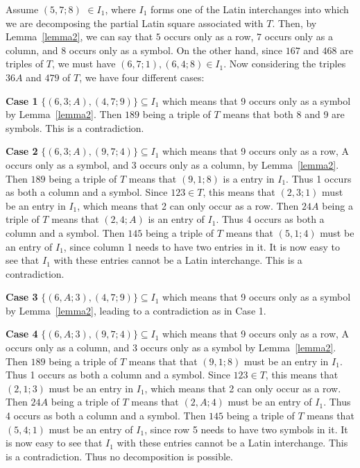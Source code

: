 \documentclass[12pt]{report}
\begin{document}
Assume $(5, 7; 8)$ $\in I_1$, where $I_1$ forms one of the Latin interchanges 
into which we are decomposing the partial Latin square associated 
with $T$.  Then, by Lemma~\ref{lemma2}, we can say that 
$5$ occurs only as a row, $7$ occurs only as a column, and $8$ occurs
only as a symbol. On the other hand, since $167$ and $468$ are triples of $T$,
we must have $(6,7;1),(6,4;8)\in I_1$. Now considering
the triples $36A$ and $479$ of $T$, we have four different cases:

{\bf Case 1} $\{ (6, 3; A), (4, 7; 9) \} \subseteq I_1$ which means 
that 9 occurs only as a symbol by Lemma~\ref{lemma2}. Then $189$ being a 
triple of $T$ means that both 8 and 9 are symbols. This is a contradiction.

{\bf Case 2} $\{ (6, 3; A), (9, 7; 4) \} \subseteq I_1$ which means that 
9 occurs only as a row, A occurs only as a symbol, and 3 occurs only as a
column, by Lemma~\ref{lemma2}.  Then $189$ being a triple of $T$ means that 
$(9, 1; 8)$ is a entry in $I_1$.  Thus 1 occurs as both a column and 
a symbol. Since $123 \in T$, this means that $(2, 3; 1)$ must be
an entry in $I_1$, which means that 2 can only occur as a row.
Then $24A$ being a triple of $T$ means that $(2, 4; A)$ is an entry of $I_1$.
Thus 4 occurs as both a column and a symbol.
Then $145$ being a triple of $T$ means that $(5, 1; 4)$ must be an entry of $I_1$,
since column 1 needs to have two entries in it. It is now easy to see 
that $I_1$ with these entries cannot be a Latin interchange.
This is a contradiction.

{\bf Case 3} $\{ (6, A; 3), (4, 7; 9) \} \subseteq I_1$ which means that 
9 occurs only as a symbol by Lemma~\ref{lemma2}, leading to a 
contradiction as in Case 1.

{\bf Case 4} $\{ (6, A; 3), (9, 7; 4) \} \subseteq I_1$ which means 
that 9 occurs only as a row, A occurs only as a column, and 3 occurs 
only as a symbol by Lemma~\ref{lemma2}.  
Then $189$ being a triple of $T$ means that that $(9, 1; 8)$
must be an entry in $I_1$.  Thus 1 occurs as both a column and a symbol.
Since $123 \in T$, this means that $(2, 1; 3)$ must be
an entry in $I_1$, which means that 2 can only occur as a row.
Then $24A$ being a triple of $T$ means that $(2, A; 4)$ must be an entry of $I_1$.
Thus 4 occurs as both a column and a symbol.  Then $145$ being
a triple of $T$ means that $(5, 4; 1)$ must be an entry of $I_1$,
since row 5 needs to have two symbols in it. 
It is now easy to see that $I_1$ with these entries cannot be a 
Latin interchange.  This is a contradiction.  Thus no decomposition is possible.
\end{document}

